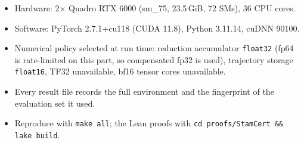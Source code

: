 \begin{itemize}[leftmargin=1.4em,itemsep=1pt]
\item Hardware: 2$\times$ Quadro RTX 6000 (sm\_75, 23.5\,GiB, 72 SMs), 36 CPU cores.
\item Software: PyTorch 2.7.1+cu118 (CUDA 11.8), Python 3.11.14, cuDNN 90100.
\item Numerical policy selected at run time: reduction accumulator \texttt{float32} (fp64 is rate-limited on this part, so compensated fp32 is used), trajectory storage \texttt{float16}, TF32 unavailable, bf16 tensor cores unavailable.
\item Every result file records the full environment and the fingerprint of the evaluation set it used.
\item Reproduce with \texttt{make all}; the Lean proofs with \texttt{cd proofs/StamCert \&\& lake build}.
\end{itemize}